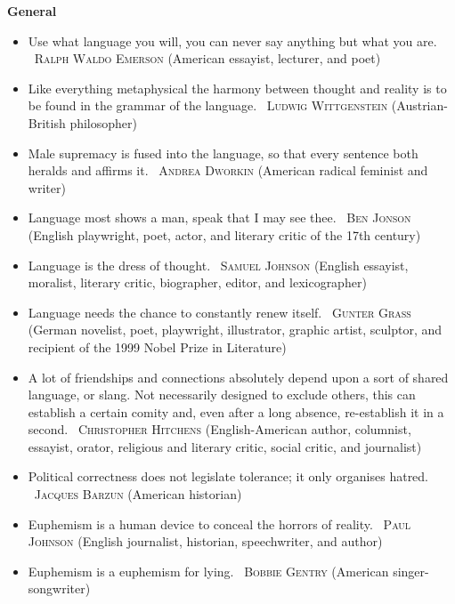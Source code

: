\documentclass[10pt, a4paper]{article}
\newcommand{\heading}[1]{\textbf{#1}}
\newcommand{\linguist}[1]{\textemdash~\textsc{#1}}
\begin{document}
\begin{center}
  \Large \bfseries \scshape {} \normalsize \normalfont {}
\end{center}
\begin{multicols}{2}
  \heading{General}
  \begin{itemize}
    \item Use what language you will, you can never say anything but what you are. \linguist{Ralph Waldo Emerson} (American essayist, lecturer, and poet)
    \item Like everything metaphysical the harmony between thought and reality is to be found in the grammar of the language. \linguist{Ludwig Wittgenstein} (Austrian-British philosopher)
    \item Male supremacy is fused into the language, so that every sentence both heralds and affirms it. \linguist{Andrea Dworkin} (American radical feminist and writer)
    \item Language most shows a man, speak that I may see thee. \linguist{Ben Jonson} (English playwright, poet, actor, and literary critic of the 17th century)
    \item Language is the dress of thought. \linguist{Samuel Johnson} (English essayist, moralist, literary critic, biographer, editor, and lexicographer)
    \item Language needs the chance to constantly renew itself. \linguist{Gunter Grass} (German novelist, poet, playwright, illustrator, graphic artist, sculptor, and recipient of the 1999 Nobel Prize in Literature)
    \item A lot of friendships and connections absolutely depend upon a sort of shared language, or slang. Not necessarily designed to exclude others, this can establish a certain comity and, even after a long absence, re-establish it in a second. \linguist{Christopher Hitchens} (English-American author, columnist, essayist, orator, religious and literary critic, social critic, and journalist)
    \item Political correctness does not legislate tolerance; it only organises hatred. \linguist{Jacques Barzun} (American historian)
    \item Euphemism is a human device to conceal the horrors of reality. \linguist{Paul Johnson} (English journalist, historian, speechwriter, and author)
    \item Euphemism is a euphemism for lying. \linguist{Bobbie Gentry} (American singer-songwriter)

\end{itemize}
\end{multicols}
\end{document}
